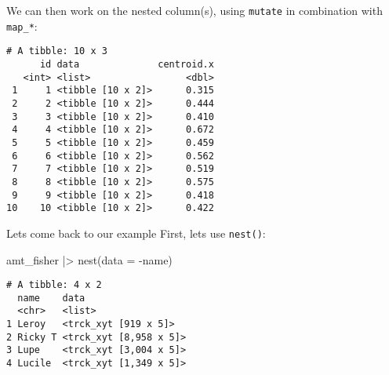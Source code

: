 \documentclass[ignorenonframetext,,t]{beamer}
\newenvironment{Shaded}{\begin{snugshade}}{\end{snugshade}}
\newcommand{\AttributeTok}[1]{\textcolor[rgb]{0.77,0.63,0.00}{#1}}
\newcommand{\FunctionTok}[1]{\textcolor[rgb]{0.00,0.00,0.00}{#1}}
\newcommand{\NormalTok}[1]{#1}
\newcommand{\SpecialCharTok}[1]{\textcolor[rgb]{0.00,0.00,0.00}{#1}}
\begin{document}
\begin{frame}[fragile]
We can then work on the nested column(s), using \texttt{mutate} in
combination with \texttt{map\_*}:

\begin{Shaded}
\end{Shaded}

\begin{verbatim}
# A tibble: 10 x 3
      id data              centroid.x
   <int> <list>                 <dbl>
 1     1 <tibble [10 x 2]>      0.315
 2     2 <tibble [10 x 2]>      0.444
 3     3 <tibble [10 x 2]>      0.410
 4     4 <tibble [10 x 2]>      0.672
 5     5 <tibble [10 x 2]>      0.459
 6     6 <tibble [10 x 2]>      0.562
 7     7 <tibble [10 x 2]>      0.519
 8     8 <tibble [10 x 2]>      0.575
 9     9 <tibble [10 x 2]>      0.418
10    10 <tibble [10 x 2]>      0.422
\end{verbatim}
\end{frame}

\begin{frame}[fragile]
\begin{block}{Lets come back to our example}
\protect\hypertarget{lets-come-back-to-our-example}{}
First, lets use \texttt{nest()}:

\begin{Shaded}
\begin{Highlighting}[]
\NormalTok{amt\_fisher }\SpecialCharTok{|\textgreater{}} \FunctionTok{nest}\NormalTok{(}\AttributeTok{data =} \SpecialCharTok{{-}}\NormalTok{name)}
\end{Highlighting}
\end{Shaded}

\begin{verbatim}
# A tibble: 4 x 2
  name    data                  
  <chr>   <list>                
1 Leroy   <trck_xyt [919 x 5]>  
2 Ricky T <trck_xyt [8,958 x 5]>
3 Lupe    <trck_xyt [3,004 x 5]>
4 Lucile  <trck_xyt [1,349 x 5]>
\end{verbatim}
\end{block}
\end{frame}
\end{document}
